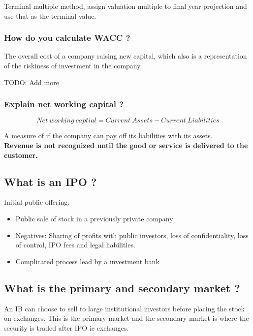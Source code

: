 \documentclass[11pt]{scrartcl} %
\begin{document}
Terminal multiple method, assign valuation multiple to final year projection and use that as the terminal value.

\subsubsection{How do you calculate WACC ?}

The overall cost of a company raising new capital, which also is a representation of the riskiness of investment in the company.

TODO: Add more

\subsubsection{Explain net working capital ?}

\[ Net\:working\:captial = Current\:Assets - Current\:Liabilities \]

A measure of if the company can pay off its liabilities with its assets. \\

\textbf{Revenue is not recognized until the good or service is delivered to the customer.}

\subsection{What is an IPO ?}

Initial public offering.

\begin{itemize}
	\item Public sale of stock in a previously private company
	\item Negatives: Sharing of profits with public investors, loss of confidentiality, loss of control, IPO fees and legal liabilities.
	\item Complicated process lead by a investment bank
\end{itemize}

\subsection{What is the primary and secondary market ?}

An IB can choose to sell to large institutional investors before placing the stock on exchanges. This is the primary market and the secondary market is where the security is traded after IPO ie exchanges. \\
\end{document}
